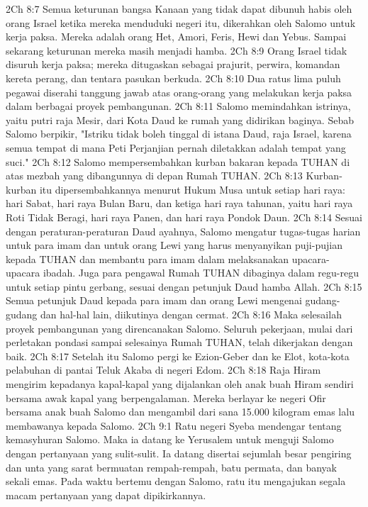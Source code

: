 2Ch 8:7  Semua keturunan bangsa Kanaan yang tidak dapat dibunuh habis oleh orang Israel ketika mereka menduduki negeri itu, dikerahkan oleh Salomo untuk kerja paksa. Mereka adalah orang Het, Amori, Feris, Hewi dan Yebus. Sampai sekarang keturunan mereka masih menjadi hamba.
2Ch 8:9  Orang Israel tidak disuruh kerja paksa; mereka ditugaskan sebagai prajurit, perwira, komandan kereta perang, dan tentara pasukan berkuda.
2Ch 8:10  Dua ratus lima puluh pegawai diserahi tanggung jawab atas orang-orang yang melakukan kerja paksa dalam berbagai proyek pembangunan.
2Ch 8:11  Salomo memindahkan istrinya, yaitu putri raja Mesir, dari Kota Daud ke rumah yang didirikan baginya. Sebab Salomo berpikir, "Istriku tidak boleh tinggal di istana Daud, raja Israel, karena semua tempat di mana Peti Perjanjian pernah diletakkan adalah tempat yang suci."
2Ch 8:12  Salomo mempersembahkan kurban bakaran kepada TUHAN di atas mezbah yang dibangunnya di depan Rumah TUHAN.
2Ch 8:13  Kurban-kurban itu dipersembahkannya menurut Hukum Musa untuk setiap hari raya: hari Sabat, hari raya Bulan Baru, dan ketiga hari raya tahunan, yaitu hari raya Roti Tidak Beragi, hari raya Panen, dan hari raya Pondok Daun.
2Ch 8:14  Sesuai dengan peraturan-peraturan Daud ayahnya, Salomo mengatur tugas-tugas harian untuk para imam dan untuk orang Lewi yang harus menyanyikan puji-pujian kepada TUHAN dan membantu para imam dalam melaksanakan upacara-upacara ibadah. Juga para pengawal Rumah TUHAN dibaginya dalam regu-regu untuk setiap pintu gerbang, sesuai dengan petunjuk Daud hamba Allah.
2Ch 8:15  Semua petunjuk Daud kepada para imam dan orang Lewi mengenai gudang-gudang dan hal-hal lain, diikutinya dengan cermat.
2Ch 8:16  Maka selesailah proyek pembangunan yang direncanakan Salomo. Seluruh pekerjaan, mulai dari perletakan pondasi sampai selesainya Rumah TUHAN, telah dikerjakan dengan baik.
2Ch 8:17  Setelah itu Salomo pergi ke Ezion-Geber dan ke Elot, kota-kota pelabuhan di pantai Teluk Akaba di negeri Edom.
2Ch 8:18  Raja Hiram mengirim kepadanya kapal-kapal yang dijalankan oleh anak buah Hiram sendiri bersama awak kapal yang berpengalaman. Mereka berlayar ke negeri Ofir bersama anak buah Salomo dan mengambil dari sana 15.000 kilogram emas lalu membawanya kepada Salomo.
2Ch 9:1  Ratu negeri Syeba mendengar tentang kemasyhuran Salomo. Maka ia datang ke Yerusalem untuk menguji Salomo dengan pertanyaan yang sulit-sulit. Ia datang disertai sejumlah besar pengiring dan unta yang sarat bermuatan rempah-rempah, batu permata, dan banyak sekali emas. Pada waktu bertemu dengan Salomo, ratu itu mengajukan segala macam pertanyaan yang dapat dipikirkannya.
